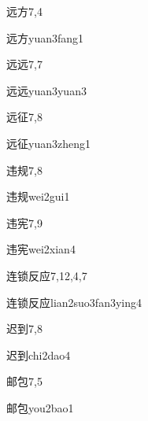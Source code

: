 \begin{entry}{远方}{7,4}
  \begin{phonetics}{远方}{yuan3fang1}
  \end{phonetics}
\end{entry}

\begin{entry}{远远}{7,7}
  \begin{phonetics}{远远}{yuan3yuan3}
  \end{phonetics}
\end{entry}

\begin{entry}{远征}{7,8}
  \begin{phonetics}{远征}{yuan3zheng1}
  \end{phonetics}
\end{entry}

\begin{entry}{违规}{7,8}
  \begin{phonetics}{违规}{wei2gui1}
  \end{phonetics}
\end{entry}

\begin{entry}{违宪}{7,9}
  \begin{phonetics}{违宪}{wei2xian4}
  \end{phonetics}
\end{entry}

\begin{entry}{连锁反应}{7,12,4,7}
  \begin{phonetics}{连锁反应}{lian2suo3fan3ying4}
  \end{phonetics}
\end{entry}

\begin{entry}{迟到}{7,8}
  \begin{phonetics}{迟到}{chi2dao4}
  \end{phonetics}
\end{entry}

\begin{entry}{邮包}{7,5}
  \begin{phonetics}{邮包}{you2bao1}
  \end{phonetics}
\end{entry}

